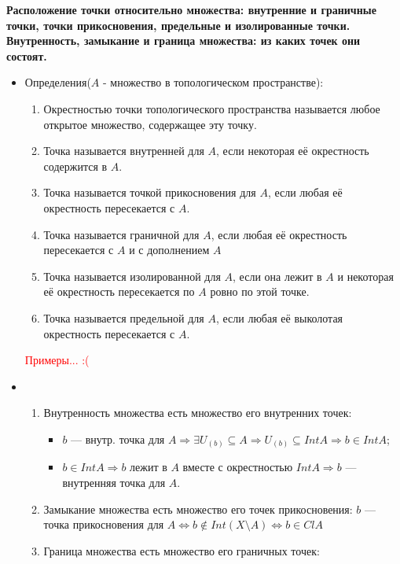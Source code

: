 \documentclass[a4paper,100pt]{article}
\theoremstyle{indented}
\begin{document}
\textbf{ Расположение точки относительно множества: внутренние и граничные точки, точки прикосновения, предельные и изолированные точки. Внутренность, замыкание и граница множества: из каких точек они состоят.}
    \begin{itemize}
        \item Определения($A$ - множество в топологическом пространстве):
        \begin{enumerate}
            \item Окрестностью точки топологического пространства называется любое открытое множество, содержащее эту точку.
            \item Точка называется внутренней для $A$, если некоторая её окрестность содержится в $A$.
            \item Точка называется точкой прикосновения для $A$, если любая её окрестность пересекается с $A$.
            \item Точка называется граничной для $A$, если любая её окрестность пересекается с $A$ и с дополнением $A$
            \item Точка называется изолированной для $A$, если она лежит в $A$ и некоторая её окрестность пересекается по $A$ ровно по этой точке.
            \item Точка называется предельной для $A$, если любая её выколотая окрестность пересекается с $A$.
        \end{enumerate}
        \textcolor{red}{Примеры... :(}
        
        \item 
        \begin{enumerate}
            \item Внутренность множества есть множество его внутренних точек:
                \begin{itemize}
                    \item $b$ --- внутр. точка для $A \Rightarrow \exists U_{(b)} \subseteq A \Rightarrow U_{(b)} \subseteq Int A  \Rightarrow b \in IntA$;
                    \item $b \in Int A \Rightarrow b \text{ лежит в $A$ вместе с окрестностью } IntA \Rightarrow b$ --- внутренняя точка для $A$. 
                \end{itemize}
            \item Замыкание множества есть множество его точек прикосновения:
                    $b$ --- точка прикосновения для $A \iff b \notin Int(X \setminus A) \iff b \in ClA$
            \item Граница множества есть множество его граничных точек:
            

\end{enumerate}
\end{itemize}
\end{document}
